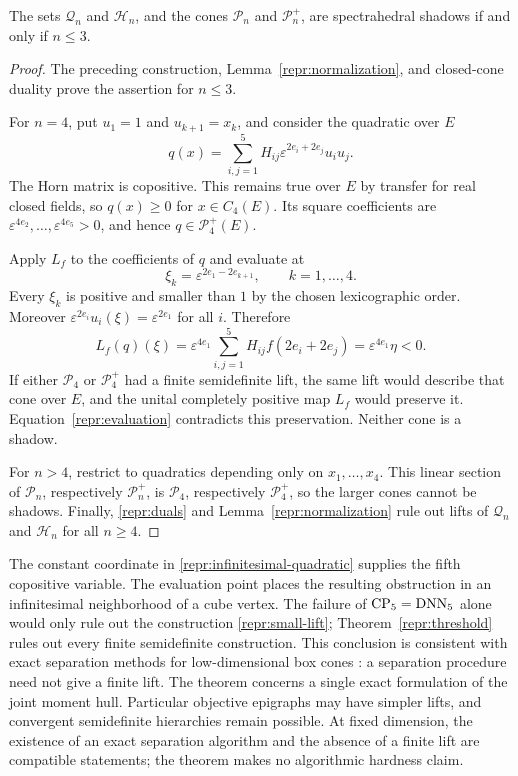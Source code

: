 \begin{theorem}\label{repr:threshold}
The sets $\mathcal Q_n$ and $\mathcal H_n$, and the cones
$\mathcal P_n$ and $\mathcal P_n^+$, are spectrahedral shadows if and only if
$n\leq3$.
\end{theorem}
\begin{proof}
The preceding construction, Lemma~\ref{repr:normalization}, and closed-cone
duality prove the assertion for $n\leq3$.

For $n=4$, put $u_1=1$ and $u_{k+1}=x_k$, and consider the quadratic over $E$
\begin{equation}\label{repr:infinitesimal-quadratic}
 q(x)=\sum_{i,j=1}^5 H_{ij}
       \varepsilon^{2e_i+2e_j}u_i u_j.
\end{equation}
The Horn matrix is copositive. This remains true over $E$ by transfer for real
closed fields, so $q(x)\geq0$ for $x\in C_4(E)$. Its square coefficients are
$\varepsilon^{4e_2},\ldots,\varepsilon^{4e_5}>0$, and hence
$q\in\mathcal P_4^+(E)$.

Apply $L_f$ to the coefficients of $q$ and evaluate at
\[
 \xi_k=\varepsilon^{2e_1-2e_{k+1}},\qquad k=1,\ldots,4.
\]
Every $\xi_k$ is positive and smaller than $1$ by the chosen lexicographic
order. Moreover
$\varepsilon^{2e_i}u_i(\xi)=\varepsilon^{2e_1}$ for all $i$.
Therefore
\begin{equation}\label{repr:evaluation}
 L_f(q)(\xi)=\varepsilon^{4e_1}
       \sum_{i,j=1}^5H_{ij}f(2e_i+2e_j)
       =\varepsilon^{4e_1}\eta<0.
\end{equation}
If either $\mathcal P_4$ or $\mathcal P_4^+$ had a finite semidefinite lift,
the same lift would describe that cone over $E$, and the unital completely
positive map $L_f$ would preserve it. Equation~\eqref{repr:evaluation}
contradicts this preservation. Neither cone is a shadow.

For $n>4$, restrict to quadratics depending only on $x_1,\ldots,x_4$.
This linear section of $\mathcal P_n$, respectively $\mathcal P_n^+$, is
$\mathcal P_4$, respectively $\mathcal P_4^+$, so the larger cones cannot
be shadows. Finally, \eqref{repr:duals} and
Lemma~\ref{repr:normalization} rule out lifts of $\mathcal Q_n$ and
$\mathcal H_n$ for all $n\geq4$.
\end{proof}

The constant coordinate in \eqref{repr:infinitesimal-quadratic} supplies the
fifth copositive variable. The evaluation point places the resulting
obstruction in an infinitesimal neighborhood of a cube vertex. The failure
of $\operatorname{CP}_5=\operatorname{DNN}_5$ alone would only rule out the construction
\eqref{repr:small-lift}; Theorem~\ref{repr:threshold} rules out every finite
semidefinite construction. This conclusion is consistent with exact separation
methods for low-dimensional box cones \citep{BurerDong2013}: a separation
procedure need not give a finite lift.
The theorem concerns a single exact formulation of the joint moment hull.
Particular objective epigraphs may have simpler lifts, and convergent
semidefinite hierarchies remain possible. At fixed dimension, the existence
of an exact separation algorithm and the absence of a finite lift are
compatible statements; the theorem makes no algorithmic hardness claim.

